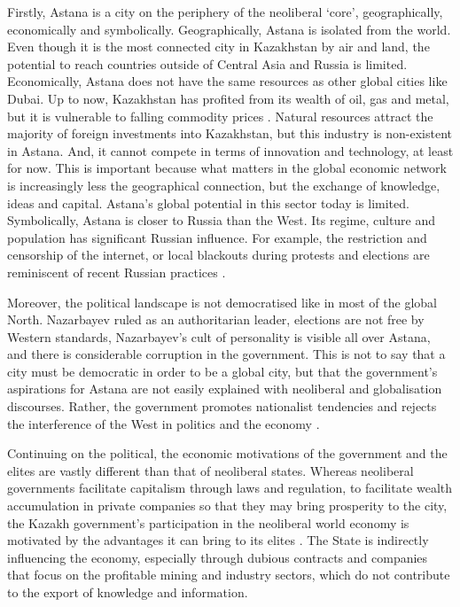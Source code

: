 \documentclass{article}
\begin{document}
Firstly, Astana is a city on the periphery of the neoliberal `core', geographically, economically and symbolically.  
Geographically, Astana is isolated from the world. Even though it is the most connected city in Kazakhstan by air and land, the potential to reach countries outside of Central Asia and Russia is limited.
Economically, Astana does not have the same resources as other global cities like Dubai. Up to now, Kazakhstan has profited from its wealth of oil, gas and metal, but it is vulnerable to falling commodity prices \parencite{batsaikhan2017central}. Natural resources attract the majority of foreign investments into Kazakhstan, but this industry is non-existent in Astana. And, it cannot compete in terms of innovation and technology, at least for now.
This is important because what matters in the global economic network is increasingly less the geographical connection, but the exchange of knowledge, ideas and capital. Astana's global potential in this sector today is limited.
Symbolically, Astana is closer to Russia than the West. Its regime, culture and population has significant Russian influence. For example, the restriction and censorship of the internet, or local blackouts during protests and elections are reminiscent of recent Russian practices \parencite{freedomhouse2021}.

Moreover, the political landscape is not democratised like in most of the global North. Nazarbayev ruled as an authoritarian leader, elections are not free by Western standards, Nazarbayev's cult of personality is visible all over Astana, and there is considerable corruption in the government. This is not to say that a city must be democratic in order to be a global city, but that the government's aspirations for Astana are not easily explained with neoliberal and globalisation discourses. Rather, the government promotes nationalist tendencies and rejects the interference of the West in politics and the economy \parencite{koch2013not}. 

Continuing on the political, the economic motivations of the government and the elites are vastly different than that of neoliberal states. Whereas neoliberal governments facilitate capitalism through laws and regulation, to facilitate wealth accumulation in private companies so that they may bring prosperity to the city, the Kazakh government's participation in the neoliberal world economy is motivated by the advantages it can bring to its elites \parencite{gallo2021three}. The State is indirectly influencing the economy, especially through dubious contracts and companies that focus on the profitable mining and industry sectors, which do not contribute to the export of knowledge and information.
\end{document}
